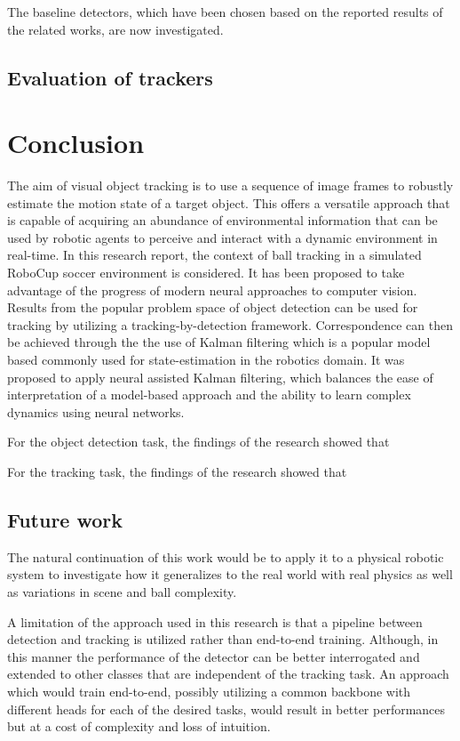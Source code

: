 \documentclass[a4paper,twoside,12pt]{report}
\begin{document}
The baseline detectors, which have been chosen based on the reported results of the related works, are now investigated.

\section{Evaluation of trackers}

\chapter{Conclusion}

The aim of visual object tracking is to use a sequence of image frames to robustly estimate the motion state of a target object. This offers a versatile approach that is capable of acquiring an abundance of environmental information that can be used by robotic agents to perceive and interact with a dynamic environment in real-time. In this research report, the context of ball tracking in a simulated RoboCup soccer environment is considered. It has been proposed to take advantage of the progress of modern neural approaches to computer vision. Results from the popular problem space of object detection can be used for tracking by utilizing a tracking-by-detection framework. Correspondence can then be achieved through the the use of Kalman filtering which is a popular model based commonly used for state-estimation in the robotics domain. It was proposed to apply neural assisted Kalman filtering, which balances the ease of interpretation of a model-based approach and the ability to learn complex dynamics using neural networks. 

For the object detection task, the findings of the research showed that

For the tracking task, the findings of the research showed that

\section{Future work}

The natural continuation of this work would be to apply it to a physical robotic system to investigate how it generalizes to the real world with real physics as well as variations in scene and ball complexity.

A limitation of the approach used in this research is that a pipeline between detection and tracking is utilized rather than end-to-end training. Although, in this manner the performance of the detector can be better interrogated and extended to other classes that are independent of the tracking task. An approach which would train end-to-end, possibly utilizing a common backbone with different heads for each of the desired tasks, would result in better performances but at a cost of complexity and loss of intuition.
\end{document}
